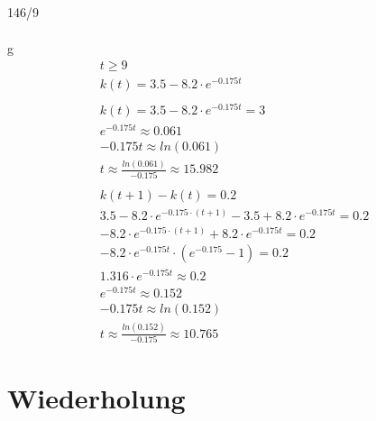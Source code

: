 \begin{exercise}{146/9}
\begin{gather*}
  \end{gather*}
  \item [g]
  \begin{gather*}
    t \geq 9 \\
    k(t) = 3.5 - 8.2 \cdot e^{-0.175t} \\\\
    k(t) = 3.5 - 8.2 \cdot e^{-0.175t} = 3 \\
    e^{-0.175t} \approx 0.061 \\
    -0.175t \approx ln(0.061) \\
    t \approx \frac{ln(0.061)}{-0.175} \approx 15.982 \\\\
    k(t + 1) - k(t) = 0.2 \\
    3.5 - 8.2 \cdot e^{-0.175 \cdot (t + 1)} - 3.5 + 8.2 \cdot e^{-0.175t} = 0.2 \\
    -8.2 \cdot e^{-0.175 \cdot (t + 1)} + 8.2 \cdot e^{-0.175t} = 0.2 \\
    -8.2 \cdot e^{-0.175t} \cdot (e^{-0.175} - 1) = 0.2 \\
    1.316 \cdot e^{-0.175t} \approx 0.2 \\
    e^{-0.175t} \approx 0.152 \\
    -0.175t \approx ln(0.152) \\
    t \approx \frac{ln(0.152)}{-0.175} \approx 10.765
  \end{gather*}
\end{exercise}
\newpage
\section{Wiederholung}
